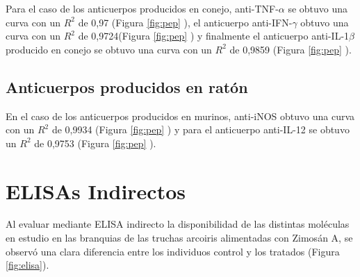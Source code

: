\documentclass[12pt,letterpaper,oneside]{scrbook}
\begin{document}
Para el caso de los anticuerpos producidos en conejo,
anti-TNF-\(\alpha\) se obtuvo una curva con un \(R^2\) de 0,97 (Figura
\ref{fig:pep} ), el anticuerpo anti-IFN-\(\gamma\)
obtuvo una curva con un \(R^2\) de 0,9724(Figura \ref{fig:pep}
) y finalmente el anticuerpo anti-IL-1\(\beta\)
producido en conejo se obtuvo una curva con un \(R^2\) de 0,9859 (Figura
\ref{fig:pep} ).

\subsection{Anticuerpos producidos en ratón}

En el caso de los anticuerpos producidos en murinos, anti-iNOS obtuvo
una curva con un \(R^2\) de 0,9934 (Figura \ref{fig:pep}
) y para el anticuerpo anti-IL-12 se obtuvo un
\(R^2\) de 0,9753 (Figura \ref{fig:pep} ).

\section{ELISAs Indirectos}

Al evaluar mediante ELISA indirecto la disponibilidad de las distintas
moléculas en estudio en las branquias de las truchas arcoiris
alimentadas con Zimosán A, se observó una clara diferencia entre los
individuos control y los tratados (Figura \ref{fig:elisa}).
\end{document}
